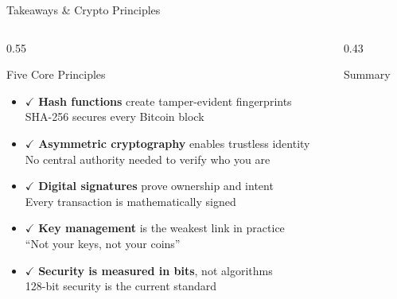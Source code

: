 \documentclass[8pt,aspectratio=169]{beamer}
\begin{document}
\begin{frame}{Takeaways \& Crypto Principles}
\begin{columns}[T]
\begin{column}{0.55\textwidth}
\begin{block}{\normalsize Five Core Principles}
\begin{itemize}\setlength\itemsep{5pt}
\item \textcolor{mlgreen!80!black}{\bfseries$\checkmark$}
  \textbf{Hash functions} create tamper-evident fingerprints\\
  {\scriptsize SHA-256 secures every Bitcoin block}

\item \textcolor{mlgreen!80!black}{\bfseries$\checkmark$}
  \textbf{Asymmetric cryptography} enables trustless identity\\
  {\scriptsize No central authority needed to verify who you are}

\item \textcolor{mlgreen!80!black}{\bfseries$\checkmark$}
  \textbf{Digital signatures} prove ownership and intent\\
  {\scriptsize Every transaction is mathematically signed}

\item \textcolor{mlgreen!80!black}{\bfseries$\checkmark$}
  \textbf{Key management} is the weakest link in practice\\
  {\scriptsize ``Not your keys, not your coins''}

\item \textcolor{mlgreen!80!black}{\bfseries$\checkmark$}
  \textbf{Security is measured in bits}, not algorithms\\
  {\scriptsize 128-bit security is the current standard}
\end{itemize}
\end{block}
\end{column}
\begin{column}{0.43\textwidth}
\begin{block}{\normalsize Summary}
\begin{center}
\end{center}
\end{block}
\end{column}
\end{columns}
\end{frame}
\end{document}
